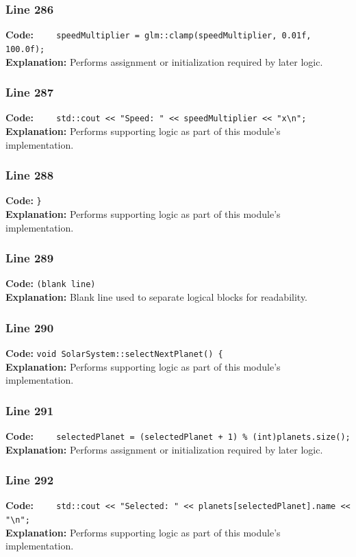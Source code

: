 \documentclass[11pt,a4paper]{article}
\begin{document}
\subsubsection*{Line 286}
\textbf{Code:} \verb|    speedMultiplier = glm::clamp(speedMultiplier, 0.01f, 100.0f);|\\
\textbf{Explanation:} Performs assignment or initialization required by later logic.

\subsubsection*{Line 287}
\textbf{Code:} \verb|    std::cout << "Speed: " << speedMultiplier << "x\n";|\\
\textbf{Explanation:} Performs supporting logic as part of this module's implementation.

\subsubsection*{Line 288}
\textbf{Code:} \verb|}|\\
\textbf{Explanation:} Performs supporting logic as part of this module's implementation.

\subsubsection*{Line 289}
\textbf{Code:} \texttt{(blank line)}\\
\textbf{Explanation:} Blank line used to separate logical blocks for readability.

\subsubsection*{Line 290}
\textbf{Code:} \verb|void SolarSystem::selectNextPlanet() {|\\
\textbf{Explanation:} Performs supporting logic as part of this module's implementation.

\subsubsection*{Line 291}
\textbf{Code:} \verb|    selectedPlanet = (selectedPlanet + 1) % (int)planets.size();|\\
\textbf{Explanation:} Performs assignment or initialization required by later logic.

\subsubsection*{Line 292}
\textbf{Code:} \verb|    std::cout << "Selected: " << planets[selectedPlanet].name << "\n";|\\
\textbf{Explanation:} Performs supporting logic as part of this module's implementation.
\end{document}
